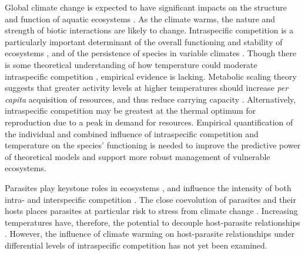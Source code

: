 Global climate change is expected to have significant impacts on the structure and function of aquatic ecosystems \citep{carpenter2011, ogorman2012}. As the climate warms, the nature and strength of biotic interactions are likely to change. Intraspecific competition is a particularly important determinant of  the overall functioning and stability of ecosystems \citep{barabas2016}, and of the persistence of species in variable climates \citep{pilfold2014, stenseth2015}. Though there is some theoretical understanding of how temperature could moderate intraspecific competition \citep{amarasekare2015}, empirical evidence is lacking. Metabolic scaling theory suggests that greater activity levels at higher temperatures should increase \emph{per capita} acquisition of resources, and thus reduce carrying capacity \citep{savage2004}. Alternatively, intraspecific competition may be greatest at the thermal optimum for reproduction due to a peak in demand for resources. Empirical quantification of the individual and combined influence of intraspecific competition and temperature on the species' functioning is needed to improve the predictive power of theoretical models and support more robust management of vulnerable ecosystems. 

Parasites play keystone roles in ecosystems \citep{hatcher2008}, and influence the intensity of both intra- and interspecific competition \citep{yan1995, macneil2003}. The close coevolution of parasites and their hosts places parasites at particular risk to stress from climate change \citep{carlson2017}. Increasing temperatures have, therefore, the potential to decouple host-parasite relationships \citep{goedknegt2015, strepparava2017}. However, the influence of climate warming on host-parasite relationships under differential levels of intraspecific competition has not yet been examined. 

